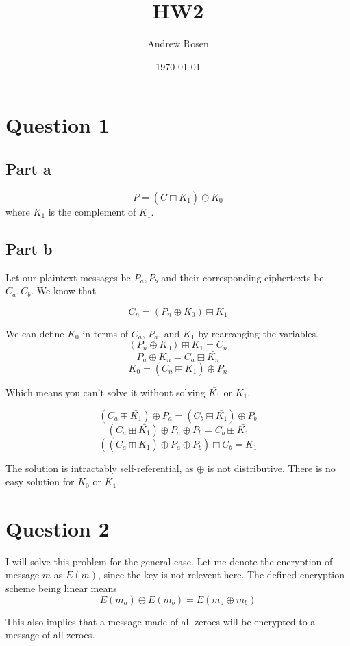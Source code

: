 \documentclass[a4paper,10pt]{article}
\title{HW2}
\author{Andrew Rosen}
\date{\today}
\begin{document}
\maketitle
\section{Question 1}

\subsection{Part a}
$$P = (C \boxplus \bar{K_{1}}) \oplus K_{0}$$ where $\bar{K_{1}}$ is the complement of $K_{1}$. 
\subsection{Part b}
Let our plaintext messages be $P_{a}, P_{b} $ and their corresponding ciphertexts be $C_{a}, C_{b}$.  We know that

$$ C_{n} = (P_{n} \oplus K_{0}) \boxplus K_{1} $$

We can define $K_{0}$ in terms of $C_{a}$, $P_{a}$, and $K_{1}$ by rearranging the variables.   
$$ (P_{n} \oplus K_{0}) \boxplus K_{1}  = C_{n} $$
$$  P_{a} \oplus K_{n} = C_{a} \boxplus \bar{K_{n}} $$
$$  K_{0} = (C_{n} \boxplus \bar{K_{1}}) \oplus P_{n} $$

Which means you can't solve it without solving $\bar{K_{1}}$ or ${K_{1}}$.

$$(C_{a} \boxplus \bar{K_{1}}) \oplus P_{a} = (C_{b} \boxplus \bar{K_{1}}) \oplus P_{b} $$
$$(C_{a} \boxplus \bar{K_{1}}) \oplus P_{a} \oplus P_{b} = C_{b} \boxplus \bar{K_{1}}$$
$$\left(\left(C_{a} \boxplus \bar{K_{1}}\right) \oplus P_{a} \oplus P_{b}\right) \boxplus C_{b} =  \bar{K_{1}}$$

The solution is intractably self-referential, as $\oplus$ is not distributive.  There is no easy solution for $K_{0}$ or $K_{1}$.
\pagebreak

\section{Question 2}

I will solve this problem for the general case.  Let me denote the encryption of message $m$ as $E(m)$, since the key is not relevent here.  The defined encryption scheme being linear means 
$$E(m_{a}) \oplus E(m_{b})  =  E(m_{a} \oplus m_{b})$$

This also implies that a message made of all zeroes will be encrypted to a message of all zeroes.
\end{document}

